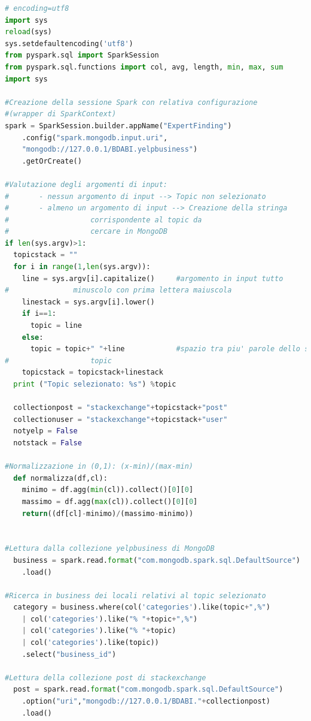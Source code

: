 \begin{lstlisting}[language=Python, caption={Expert Finding}, captionpos=b]
# encoding=utf8
import sys
reload(sys)
sys.setdefaultencoding('utf8')
from pyspark.sql import SparkSession
from pyspark.sql.functions import col, avg, length, min, max, sum
import sys

#Creazione della sessione Spark con relativa configurazione 
#(wrapper di SparkContext)
spark = SparkSession.builder.appName("ExpertFinding")
	.config("spark.mongodb.input.uri", 
	"mongodb://127.0.0.1/BDABI.yelpbusiness")
	.getOrCreate()

#Valutazione degli argomenti di input:
#       - nessun argomento di input --> Topic non selezionato
#       - almeno un argomento di input --> Creazione della stringa 
#					corrispondente al topic da 
#					cercare in MongoDB
if len(sys.argv)>1:
  topicstack = ""
  for i in range(1,len(sys.argv)):
    line = sys.argv[i].capitalize()     #argomento in input tutto 
#				minuscolo con prima lettera maiuscola
    linestack = sys.argv[i].lower()
    if i==1:
      topic = line
    else:
      topic = topic+" "+line            #spazio tra piu' parole dello stesso 
#					topic
    topicstack = topicstack+linestack
  print ("Topic selezionato: %s") %topic

  collectionpost = "stackexchange"+topicstack+"post"
  collectionuser = "stackexchange"+topicstack+"user"
  notyelp = False
  notstack = False

#Normalizzazione in (0,1): (x-min)/(max-min)
  def normalizza(df,cl):
    minimo = df.agg(min(cl)).collect()[0][0]
    massimo = df.agg(max(cl)).collect()[0][0]
    return((df[cl]-minimo)/(massimo-minimo))


#Lettura dalla collezione yelpbusiness di MongoDB
  business = spark.read.format("com.mongodb.spark.sql.DefaultSource")
	.load()

#Ricerca in business dei locali relativi al topic selezionato
  category = business.where(col('categories').like(topic+",%") 
	| col('categories').like("% "+topic+",%") 
	| col('categories').like("% "+topic) 
	| col('categories').like(topic))
	.select("business_id")

#Lettura della collezione post di stackexchange
  post = spark.read.format("com.mongodb.spark.sql.DefaultSource")
	.option("uri","mongodb://127.0.0.1/BDABI."+collectionpost)
	.load()


\end{lstlisting}
